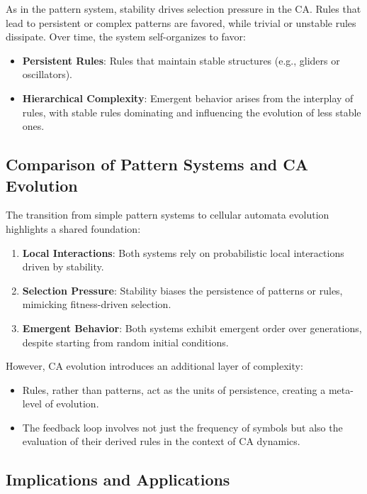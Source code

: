 \documentclass[entropy,article,submit,pdftex,moreauthors]{Definitions/mdpi}
\begin{document}
As in the pattern system, stability drives selection pressure in the CA. Rules that lead to persistent or complex patterns are favored, while trivial or unstable rules dissipate. Over time, the system self-organizes to favor:
\begin{itemize}
    \item \textbf{Persistent Rules}: Rules that maintain stable structures (e.g., gliders or oscillators).
    \item \textbf{Hierarchical Complexity}: Emergent behavior arises from the interplay of rules, with stable rules dominating and influencing the evolution of less stable ones.
\end{itemize}

\subsection{Comparison of Pattern Systems and CA Evolution}

The transition from simple pattern systems to cellular automata evolution highlights a shared foundation:
\begin{enumerate}
    \item \textbf{Local Interactions}: Both systems rely on probabilistic local interactions driven by stability.
    \item \textbf{Selection Pressure}: Stability biases the persistence of patterns or rules, mimicking fitness-driven selection.
    \item \textbf{Emergent Behavior}: Both systems exhibit emergent order over generations, despite starting from random initial conditions.
\end{enumerate}

However, CA evolution introduces an additional layer of complexity:
\begin{itemize}
    \item Rules, rather than patterns, act as the units of persistence, creating a meta-level of evolution.
    \item The feedback loop involves not just the frequency of symbols but also the evaluation of their derived rules in the context of CA dynamics.
\end{itemize}

\subsection{Implications and Applications}
\end{document}
